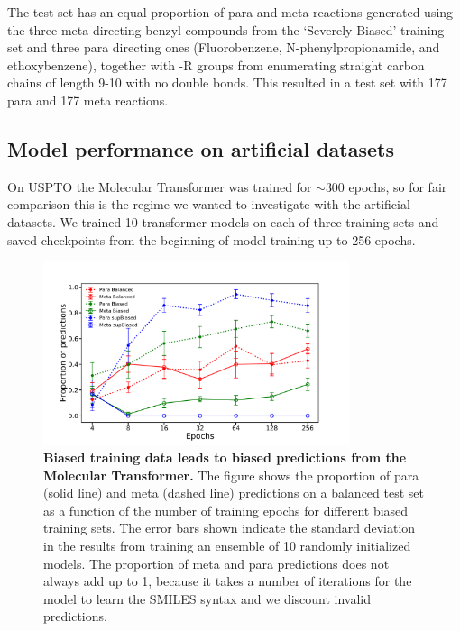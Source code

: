 The test set has an equal proportion of para and meta reactions generated using the three meta directing benzyl compounds from the `Severely Biased' training set and three para directing ones (Fluorobenzene, N-phenylpropionamide, and ethoxybenzene), together with -R groups from enumerating straight carbon chains of length 9-10 with no double bonds. This resulted in a test set with 177 para and 177 meta reactions.

\subsection{Model performance on artificial datasets}

On USPTO the Molecular Transformer was trained for $\sim$300 epochs, so for fair comparison this is the regime we wanted to investigate with the artificial datasets. We trained 10 transformer models on each of three training sets and saved checkpoints from the beginning of model training up to 256 epochs.

\begin{figure}[htb!] 
    \centering    
    \includegraphics[width=0.8\textwidth]{Chapters/Transformer/Figs/synth_conv.png}
    \caption{ \textbf{Biased training data leads to biased predictions from the Molecular Transformer.} The figure shows the proportion of para (solid line) and meta (dashed line) predictions on a balanced test set as a function of the number of training epochs for different biased training sets. The error bars shown indicate the standard deviation in the results from training an ensemble of 10 randomly initialized models. The proportion of meta and para predictions does not always add up to 1, because it takes a number of iterations for the model to learn the SMILES syntax and we discount invalid predictions.}
    \label{fig:hamburger_plot}
\end{figure}



